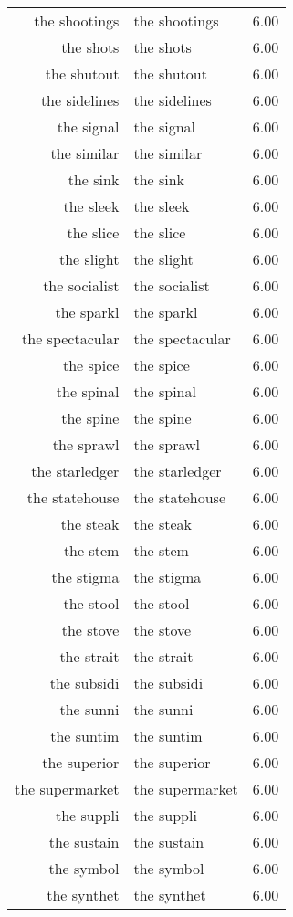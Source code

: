 \begin{table}[ht]
\begin{tabular}{rlr}
  the shootings & the shootings & 6.00 \\ 
  the shots & the shots & 6.00 \\ 
  the shutout & the shutout & 6.00 \\ 
  the sidelines & the sidelines & 6.00 \\ 
  the signal & the signal & 6.00 \\ 
  the similar & the similar & 6.00 \\ 
  the sink & the sink & 6.00 \\ 
  the sleek & the sleek & 6.00 \\ 
  the slice & the slice & 6.00 \\ 
  the slight & the slight & 6.00 \\ 
  the socialist & the socialist & 6.00 \\ 
  the sparkl & the sparkl & 6.00 \\ 
  the spectacular & the spectacular & 6.00 \\ 
  the spice & the spice & 6.00 \\ 
  the spinal & the spinal & 6.00 \\ 
  the spine & the spine & 6.00 \\ 
  the sprawl & the sprawl & 6.00 \\ 
  the starledger & the starledger & 6.00 \\ 
  the statehouse & the statehouse & 6.00 \\ 
  the steak & the steak & 6.00 \\ 
  the stem & the stem & 6.00 \\ 
  the stigma & the stigma & 6.00 \\ 
  the stool & the stool & 6.00 \\ 
  the stove & the stove & 6.00 \\ 
  the strait & the strait & 6.00 \\ 
  the subsidi & the subsidi & 6.00 \\ 
  the sunni & the sunni & 6.00 \\ 
  the suntim & the suntim & 6.00 \\ 
  the superior & the superior & 6.00 \\ 
  the supermarket & the supermarket & 6.00 \\ 
  the suppli & the suppli & 6.00 \\ 
  the sustain & the sustain & 6.00 \\ 
  the symbol & the symbol & 6.00 \\ 
  the synthet & the synthet & 6.00 \\ 

\end{tabular}
\end{table}
